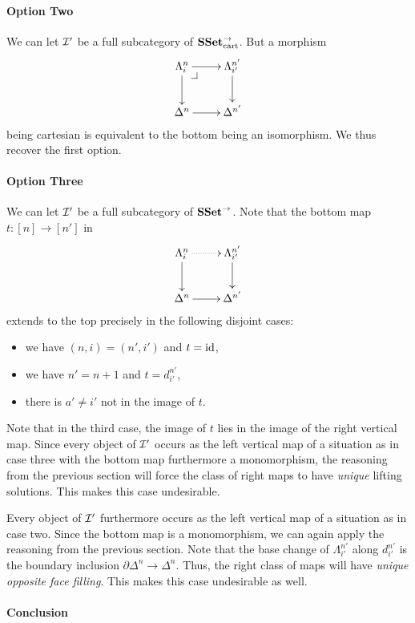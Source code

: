 \documentclass[reqno,10pt,a4paper,oneside]{amsart}
\begin{document}
\paragraph{Option Two}

We can let $\cal{I'}$ be a full subcategory of $\SSet_{\text{cart}}^{\to}$.
But a morphism
\[
\xymatrix{
  \Lambda_i^n
  \ar[r]
  \ar[d]
  \pullback{dr}
&
  \Lambda_{i'}^{n'}
  \ar[d]
\\
  \Delta^n
  \ar[r]
&
  \Delta^{n'}
}
\]
being cartesian is equivalent to the bottom being an isomorphism.
We thus recover the first option.

\paragraph{Option Three}

We can let $\cal{I'}$ be a full subcategory of $\SSet^{\to}$.
Note that the bottom map $t : [n] \to [n']$ in
\[
\xymatrix{
  \Lambda_i^n
  \ar@{.>}[r]
  \ar[d]
&
  \Lambda_{i'}^{n'}
  \ar[d]
\\
  \Delta^n
  \ar[r]
&
  \Delta^{n'}
}
\]
extends to the top precisely in the following disjoint cases:
\begin{itemize}
\item
we have $(n, i) = (n', i')$ and $t = \id$,
\item
we have $n' = n + 1$ and $t = d_{i'}^{n'}$,
\item
there is $a' \neq i'$ not in the image of $t$.
\end{itemize}

Note that in the third case, the image of $t$ lies in the image of the right vertical map.
Since every object of $\cal{I'}$ occurs as the left vertical map of a situation as in case three with the bottom map furthermore a monomorphism, the reasoning from the previous section will force the class of right maps to have \emph{unique} lifting solutions.
This makes this case undesirable.

Every object of $\cal{I'}$ furthermore occurs as the left vertical map of a situation as in case two.
Since the bottom map is a monomorphism, we can again apply the reasoning from the previous section.
Note that the base change of $\Lambda_{i'}^{n'}$ along $d_{i'}^{n'}$ is the boundary inclusion $\partial \Delta^n \to \Delta^n$.
Thus, the right class of maps will have \emph{unique opposite face filling}.
This makes this case undesirable as well.

\paragraph{Conclusion}
\end{document}

